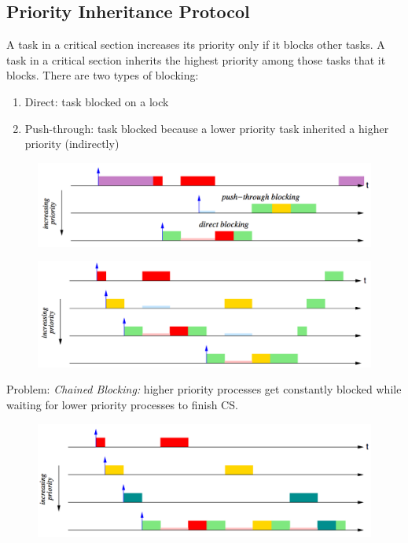 \documentclass{hw}
\begin{document}
\subsection{Priority Inheritance Protocol}
A task in a critical section increases its priority only if it blocks other 
tasks. A task in a critical section inherits the highest priority among those 
tasks that it blocks. There are two types of blocking:
\begin{enumerate}
  \item Direct: task blocked on a lock
  \item Push-through: task blocked because a lower priority task inherited a 
    higher priority (indirectly)
\end{enumerate}
\begin{figure}[H]
  \centering
  \includegraphics[scale=.6]{img/pip1}
\end{figure}
\begin{figure}[H]
  \centering
  \includegraphics[scale=.6]{img/pip2}
\end{figure}
Problem: \emph{Chained Blocking:} higher priority processes get constantly 
blocked while waiting for lower priority processes to finish CS.
\begin{figure}[H]
  \centering
  \includegraphics[scale=.6]{img/pip3}
\end{figure}
\end{document}
